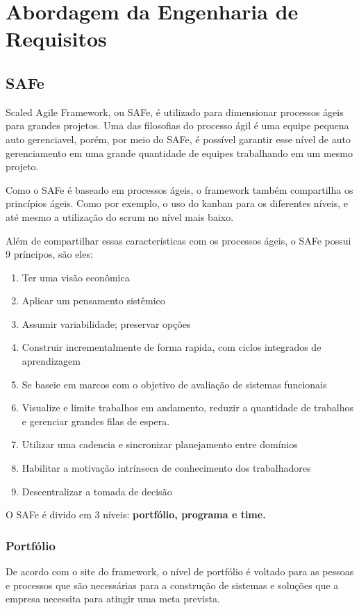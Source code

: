 \chapter{Abordagem da Engenharia de Requisitos}

\section{SAFe}
Scaled Agile Framework, ou SAFe, é utilizado para dimensionar processos ágeis para grandes projetos. Uma das filosofias do processo ágil é uma equipe pequena auto gerenciavel, porém, por meio do SAFe, é possível garantir esse nível de auto gerenciamento em uma grande quantidade de equipes trabalhando em um mesmo projeto.

Como o SAFe é baseado em processos ágeis, o framework também compartilha os princípios ágeis. Como por exemplo, o uso do kanban para os diferentes níveis, e até mesmo a utilização do scrum no nível mais baixo.

Além de compartilhar essas características com os processos ágeis, o SAFe possui 9 príncipos, são eles:
\begin{enumerate}
\item Ter uma visão econômica
\item Aplicar um pensamento sistêmico
\item Assumir variabilidade; preservar opções
\item Construir incrementalmente de forma rapida, com ciclos integrados de aprendizagem
\item Se baseie em marcos com o objetivo de avaliação de sistemas funcionais
\item Visualize e limite trabalhos em andamento, reduzir a quantidade de trabalhos e gerenciar grandes filas de espera.
\item Utilizar uma cadencia e sincronizar planejamento entre domínios
\item Habilitar a motivação intrínseca de conhecimento dos trabalhadores
\item Descentralizar a tomada de decisão
\end{enumerate}


O SAFe é divido em 3 níveis: \textbf{portfólio, programa e time.}


\subsection{Portfólio}
De acordo com o site do framework, o nível de portfólio é voltado para as pessoas e processos que são necessárias para a construção de sistemas e soluções que a empresa necessita para atingir uma meta prevista. 

